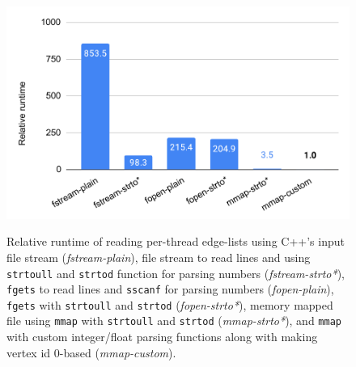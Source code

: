 \begin{figure}[hbtp]
  \centering
  \includegraphics[width=0.99\linewidth]{out/optimize-el.pdf} \\[-2ex]
  \caption{Relative runtime of reading per-thread edge-lists using C++'s input file stream (\textit{fstream-plain}), file stream to read lines and using  \texttt{strtoull} and \texttt{strtod} function for parsing numbers (\textit{fstream-strto*}), \texttt{fgets} to read lines and \texttt{sscanf} for parsing numbers (\textit{fopen-plain}), \texttt{fgets} with \texttt{strtoull} and \texttt{strtod} (\textit{fopen-strto*}), memory mapped file using \texttt{mmap} with \texttt{strtoull} and \texttt{strtod} (\textit{mmap-strto*}), and \texttt{mmap} with custom integer/float parsing functions along with making vertex id 0-based (\textit{mmap-custom}).}
  \label{fig:optimize-el}
\end{figure}
